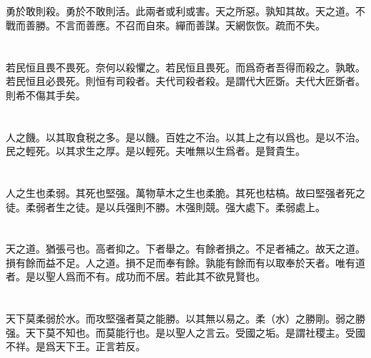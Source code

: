 \documentclass[a5paper]{ctexbook}
\begin{document}
    \chapter{}

    勇於敢則殺。勇於不敢則活。此兩者或利或害。天之所惡。孰知其故。天之道。不戰而善勝。不言而善應。不召而自來。繟而善謀。天網恢恢。疏而不失。

    \chapter{}

    若民恒且畏不畏死。奈何以殺懼之。若民恒且畏死。而爲奇者吾得而殺之。孰敢。若民恒且必畏死。則恒有司殺者。夫代司殺者殺。是謂代大匠斲。夫代大匠斲者。則希不傷其手矣。

    \chapter{}

    人之饑。以其取食税之多。是以饑。百姓之不治。以其上之有以爲也。是以不治。民之輕死。以其求生之厚。是以輕死。夫唯無以生爲者。是賢貴生。

    \chapter{}

    人之生也柔弱。其死也堅强。萬物草木之生也柔脆。其死也枯槁。故曰堅强者死之徒。柔弱者生之徒。是以兵强則不勝。木强則競。强大處下。柔弱處上。

    \chapter{}

    天之道。猶張弓也。高者抑之。下者舉之。有餘者損之。不足者補之。故天之道。損有餘而益不足。人之道。損不足而奉有餘。孰能有餘而有以取奉於天者。唯有道者。是以聖人爲而不有。成功而不居。若此其不欲見賢也。

    \chapter{}

    天下莫柔弱於水。而攻堅强者莫之能勝。以其無以易之。柔（水）之勝剛。弱之勝强。天下莫不知也。而莫能行也。是以聖人之言云。受國之垢。是謂社稷主。受國不祥。是爲天下王。正言若反。

    \chapter{}
\end{document}
